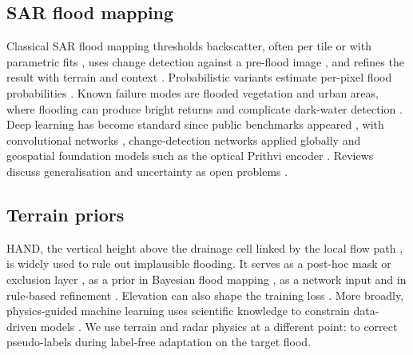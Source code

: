 \documentclass[a4paper,fleqn]{cas-sc}
\begin{document}
\subsection{SAR flood mapping}
Classical SAR flood mapping thresholds backscatter, often per tile or with parametric fits \citep{otsu1979threshold,martinis2009nrt,chini2017hsbt}, uses change detection against a pre-flood image \citep{giustarini2013change,clement2018multitemporal}, and refines the result with terrain and context \citep{twele2016s1chain,landuyt2019assessment}. Probabilistic variants estimate per-pixel flood probabilities \citep{giustarini2016probabilistic,krullikowski2023gfmensemble}. Known failure modes are flooded vegetation and urban areas, where flooding can produce bright returns and complicate dark-water detection \citep{tsyganskaya2018vegetation,zhao2024urbansarfloods}. Deep learning has become standard since public benchmarks appeared \citep{bonafilia2020sen1floods11,mateogarcia2021worldfloods,drakonakis2022ombrianet,bountos2024kurosiwo,montello2022mmflood}, with convolutional networks \citep{nemni2020unosat,bai2021basnet,konapala2021s1s2}, change-detection networks applied globally \citep{misra2025globalfloods} and geospatial foundation models such as the optical Prithvi encoder \citep{jakubik2023prithvi}. Reviews discuss generalisation and uncertainty as open problems \citep{bentivoglio2022review,lee2025geoaiflood}.

\subsection{Terrain priors}
HAND, the vertical height above the drainage cell linked by the local flow path \citep{renno2008hand,nobre2011hand}, is widely used to rule out implausible flooding. It serves as a post-hoc mask or exclusion layer \citep{twele2016s1chain,zhao2021exclusion,misra2025globalfloods}, as a prior in Bayesian flood mapping \citep{tupas2023handprior}, as a network input \citep{tian2026deepsar} and in rule-based refinement \citep{hansen2025ribe}. Elevation can also shape the training loss \citep{sami2024evanet}. More broadly, physics-guided machine learning uses scientific knowledge to constrain data-driven models \citep{karpatne2017tgds,reichstein2019deep,willard2022integrating}. We use terrain and radar physics at a different point: to correct pseudo-labels during label-free adaptation on the target flood.
\end{document}
